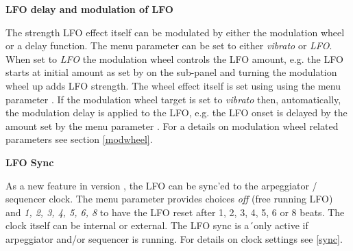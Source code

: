 \textbf{LFO delay and modulation of LFO}

The strength LFO effect itself can be modulated by either the modulation wheel or a delay function. The menu parameter \modwheeltarget can be set to either \textit{vibrato} or \textit{LFO}. When set to \textit{LFO} the modulation wheel controls the LFO amount, e.g. the LFO starts at initial amount as set by \lfoamt on the sub-panel and turning the modulation wheel up adds LFO strength. The wheel effect itself is set using using the menu parameter \modwheelrange. If the modulation wheel target is set to \textit{vibrato} then, automatically, the modulation delay is applied to the LFO, e.g. the LFO onset is delayed by the amount set by the menu parameter \moddelay. For a details on modulation wheel related parameters see section \ref{modwheel}.

\textbf{LFO Sync}

As a new feature in version \version, the LFO can be sync'ed to the arpeggiator / sequencer clock. The menu parameter \lfosync provides choices \textit{off} (free running LFO) and \textit{1, 2, 3, 4, 5, 6, 8} to have the LFO reset after 1, 2, 3, 4, 5, 6 or 8 beats. The clock itself can be internal or external. The LFO sync is a´only active if arpeggiator and/or sequencer is running. For details on clock settings see \ref{sync}.
